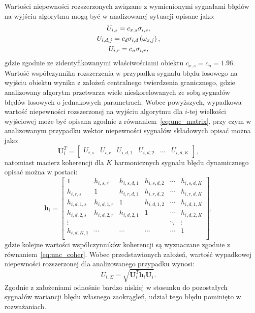 Wartości niepewności rozszerzonych związane z wymienionymi sygnałami błędów na wyjściu algorytmu mogą być w analizowanej sytuacji opisane jako:
\begin{gather}
U_{i,s} = c_{x,s} \sigma_{i,s} \label{eq:pom_uncout_stat}, \\
U_{i,d,j} = c_{d} \sigma_{i,d} \left(\omega_{x,j}\right) \label{eq:pom_uncout_dyn}, \\
U_{i,r} = c_{n} \sigma_{i,r} \label{eq:pom_uncout_rand},
\end{gather}
gdzie zgodnie ze zidentyfikowanymi właściwościami obiektu $c_{x,s} = c_{n} = 1.96$. Wartość współczynnika rozszerzenia w przypadku sygnału błędu losowego na wyjściu obiektu wynika z założeń centralnego twierdzenia granicznego, gdzie analizowany algorytm przetwarza wiele nieskorelowanych ze sobą sygnałów błędów losowych o jednakowych parametrach. Wobec powyższych, wypadkowa wartość niepewności rozszerzonej na wyjściu algorytmu dla $i$-tej wielkości wyjściowej może być opisana zgodnie z równaniem~\eqref{eq:unc_matrix}, przy czym w analizowanym przypadku wektor niepewności sygnałów składowych opisać można jako:
\begin{equation}
\mathbf{U}_{i}^{T} = 
\begin{bmatrix}
U_{i,s} & U_{i,r} & U_{i,d,1} & U_{i,d,2} & \hdots & U_{i,d,K}
\end{bmatrix}
\label{eq:pom_uncout_uncvect},
\end{equation}
natomiast macierz koherencji dla $K$ harmonicznych sygnału błędu dynamicznego opisać można w postaci:
\begin{equation}
\mathbf{h}_{i} =
\begin{bmatrix}
1           & h_{i,s,r}   & h_{i,s,d,1} & h_{i,s,d,2} & \cdots & h_{i,s,d,K} \\
h_{i,r,s}   & 1           & h_{i,r,d,1} & h_{i,r,d,2} & \cdots & h_{i,r,d,K} \\
h_{i,d,1,s} & h_{i,d,1,r} & 1           & h_{i,d,1,2} & \cdots & h_{i,d,1,K} \\
h_{i,d,2,s} & h_{i,d,2,r} & h_{i,d,2,1} & 1           & \cdots & h_{i,d,2,K} \\
\vdots      &             &             &             & \ddots & \vdots      \\
h_{i,d,K,1} & \cdots      & \cdots      & \cdots      & \cdots & 1           \\
\end{bmatrix}
\label{eq:pom_uncout_cohers},
\end{equation}
gdzie kolejne wartości współczynników koherencji są wyznaczane zgodnie z równaniem~\eqref{eq:unc_coher}. Wobec przedstawionych założeń, wartość wypadkowej niepewności rozszerzonej dla analizowanego przypadku wynosi:
\begin{equation}
U_{i,\Sigma} = \sqrt{\mathbf{U}_{i}^{T} \mathbf{h}_{i} \mathbf{U}_{i}} \label{eq:pom_uncout_sum}.
\end{equation}
Zgodnie z założeniami odnośnie bardzo niskiej w stosunku do pozostałych sygnałów wariancji błędu własnego zaokrągleń, udział tego błędu pominięto w rozważaniach.

